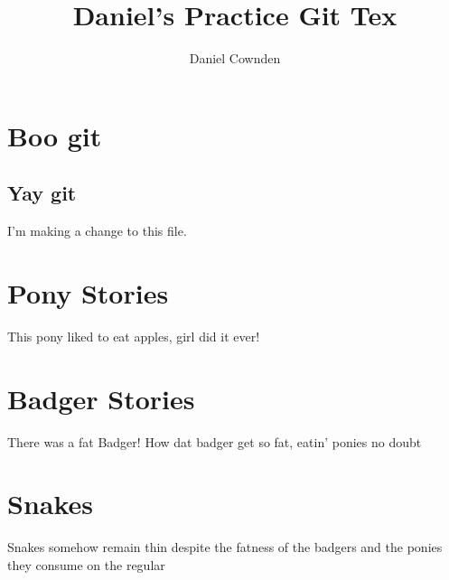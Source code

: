 \documentclass[11pt]{amsart}
\title{Daniel's Practice Git Tex}
\author{Daniel Cownden}
\begin{document}
\maketitle
\section{Boo git}
\subsection{Yay git}

I'm making a change to this file.

\section{Pony Stories}
This pony liked to eat apples, girl did it ever!

\section{Badger Stories}
There was a fat Badger!
How dat badger get so fat, eatin' ponies no doubt

\section{Snakes}
Snakes somehow remain thin despite the fatness of the badgers and the ponies they consume on the regular
\end{document}
